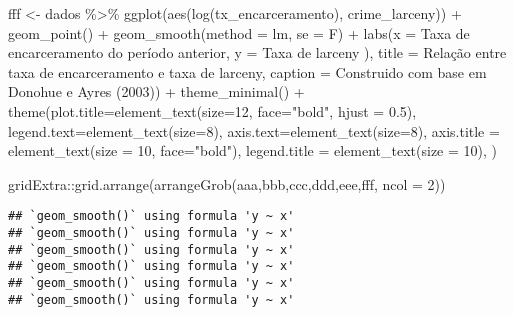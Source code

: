 \documentclass[
]{article}
\newenvironment{Shaded}{\begin{snugshade}}{\end{snugshade}}
\newcommand{\AttributeTok}[1]{\textcolor[rgb]{0.77,0.63,0.00}{#1}}
\newcommand{\DecValTok}[1]{\textcolor[rgb]{0.00,0.00,0.81}{#1}}
\newcommand{\FloatTok}[1]{\textcolor[rgb]{0.00,0.00,0.81}{#1}}
\newcommand{\FunctionTok}[1]{\textcolor[rgb]{0.00,0.00,0.00}{#1}}
\newcommand{\NormalTok}[1]{#1}
\newcommand{\OtherTok}[1]{\textcolor[rgb]{0.56,0.35,0.01}{#1}}
\newcommand{\SpecialCharTok}[1]{\textcolor[rgb]{0.00,0.00,0.00}{#1}}
\newcommand{\StringTok}[1]{\textcolor[rgb]{0.31,0.60,0.02}{#1}}
\begin{document}
\begin{Shaded}
\begin{Highlighting}[]
\NormalTok{fff }\OtherTok{\textless{}{-}}\NormalTok{ dados }\SpecialCharTok{\%\textgreater{}\%} 
  \FunctionTok{ggplot}\NormalTok{(}\FunctionTok{aes}\NormalTok{(}\FunctionTok{log}\NormalTok{(tx\_encarceramento), crime\_larceny)) }\SpecialCharTok{+}
  \FunctionTok{geom\_point}\NormalTok{() }\SpecialCharTok{+} 
  \FunctionTok{geom\_smooth}\NormalTok{(}\AttributeTok{method =} \StringTok{\textquotesingle{}lm\textquotesingle{}}\NormalTok{, }\AttributeTok{se =}\NormalTok{ F) }\SpecialCharTok{+}
  \FunctionTok{labs}\NormalTok{(}\AttributeTok{x =} \StringTok{\textquotesingle{}Taxa de encarceramento do período anterior\textquotesingle{}}\NormalTok{,}
       \AttributeTok{y =} \StringTok{\textquotesingle{}Taxa de larceny )\textquotesingle{}}\NormalTok{,}
       \AttributeTok{title =} \StringTok{\textquotesingle{}Relação entre taxa de encarceramento e taxa de larceny\textquotesingle{}}\NormalTok{,}
       \AttributeTok{caption =} \StringTok{\textquotesingle{}Construido com base em Donohue e Ayres (2003)\textquotesingle{}}\NormalTok{) }\SpecialCharTok{+} 
  \FunctionTok{theme\_minimal}\NormalTok{() }\SpecialCharTok{+}
  \FunctionTok{theme}\NormalTok{(}\AttributeTok{plot.title=}\FunctionTok{element\_text}\NormalTok{(}\AttributeTok{size=}\DecValTok{12}\NormalTok{, }\AttributeTok{face=}\StringTok{"bold"}\NormalTok{, }\AttributeTok{hjust =} \FloatTok{0.5}\NormalTok{),}
        \AttributeTok{legend.text=}\FunctionTok{element\_text}\NormalTok{(}\AttributeTok{size=}\DecValTok{8}\NormalTok{),}
        \AttributeTok{axis.text=}\FunctionTok{element\_text}\NormalTok{(}\AttributeTok{size=}\DecValTok{8}\NormalTok{),}
        \AttributeTok{axis.title =} \FunctionTok{element\_text}\NormalTok{(}\AttributeTok{size =} \DecValTok{10}\NormalTok{, }\AttributeTok{face=}\StringTok{"bold"}\NormalTok{),}
        \AttributeTok{legend.title =} \FunctionTok{element\_text}\NormalTok{(}\AttributeTok{size =} \DecValTok{10}\NormalTok{),}
\NormalTok{  )}

\NormalTok{gridExtra}\SpecialCharTok{::}\FunctionTok{grid.arrange}\NormalTok{(}\FunctionTok{arrangeGrob}\NormalTok{(aaa,bbb,ccc,ddd,eee,fff, }\AttributeTok{ncol =} \DecValTok{2}\NormalTok{))}
\end{Highlighting}
\end{Shaded}

\begin{verbatim}
## `geom_smooth()` using formula 'y ~ x'
## `geom_smooth()` using formula 'y ~ x'
## `geom_smooth()` using formula 'y ~ x'
## `geom_smooth()` using formula 'y ~ x'
## `geom_smooth()` using formula 'y ~ x'
## `geom_smooth()` using formula 'y ~ x'
\end{verbatim}
\end{document}
